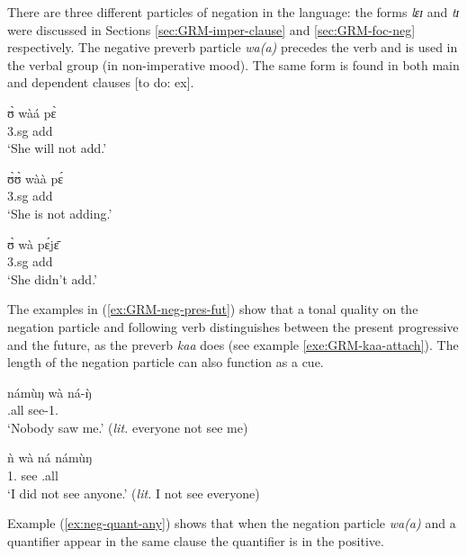 \begin{exe}
\begin{exe}
\begin{exe}
{\begin{exe}
\begin{exe}
\begin{exe}
\begin{exe}
\begin{exe}
\begin{exe}
\begin{exe}
\begin{xlist}
\begin{exe}
\begin{exe}
\begin{exe}
\begin{exe}
\begin{exe}
\begin{exe}
\begin{exe}
\begin{exe}
\begin{exe}
\begin{exe}
\begin{exe}
\begin{exe}
\begin{exe}
\begin{exe}

There are three different particles of negation in the language:  the forms 
{\it lɛɪ} and {\it tɪ}   were discussed in Sections \ref{sec:GRM-imper-clause} 
and  \ref{sec:GRM-foc-neg}  respectively.  The negative preverb particle {\it 
wa(a)} precedes the verb and is used in the verbal group (in non-imperative
mood). The same form is found in both  main and dependent clauses [to do: ex]. 


\ea\label{ex:GRM-neg-pres-fut}

\ea
\gll ʊ̀  wàá pɛ̀ \\
   {\sc 3.sg}  {\neg} add\\
\glt  `She will not add.'

 \ex 
\gll  ʊ̀ʊ̀ wàà pɛ́\\
     {\sc 3.sg} {\neg} add \\
\glt  `She is not adding.'


 \ex 
\gll  ʊ̀ wà pɛ́jɛ̄\\
     {\sc 3.sg} {\neg} add \\
\glt  `She didn't  add.'

\z 
 \z

 The examples in (\ref{ex:GRM-neg-pres-fut}) show that a tonal quality on the 
negation particle and following verb  distinguishes between the present 
progressive and  the future,  as the preverb {\it kaa} does (see example 
\ref{exe:GRM-kaa-attach}). The length of the negation particle can also 
function as a cue.

\ea\label{ex:neg-quant-any}
\ea\label{ex:neg-quant-any-1}
\gll námùŋ wà ná-ŋ̀ \\
 {\clf}.all {\neg} see-{1.\sg}\\
\glt  `Nobody saw me.' ({\it lit.} everyone not see me) 

\ex\label{ex:neg-quant-any-2}
\gll  ǹ wà ná námùŋ  \\
  {1.\sg}  {\neg}   see  {\clf}.all\\
\glt  `I did not see anyone.' ({\it lit.} I not see everyone) 

\z 
 \z

 Example (\ref{ex:neg-quant-any}) shows that when the negation particle {\it 
wa(a)} and a quantifier appear in the same clause the quantifier is  in the 
positive. 




\ea\label{ex:GRM-neg-come}
 

\end{exe}
\end{exe}
\end{exe}
\end{exe}
\end{exe}
\end{exe}
\end{exe}
\end{exe}
\end{exe}
\end{exe}
\end{exe}
\end{exe}
\end{exe}
\end{exe}
\end{xlist}
\end{exe}
\end{exe}
\end{exe}
\end{exe}
\end{exe}
\end{exe}
\end{exe}}
\end{exe}
\end{exe}
\end{exe}

